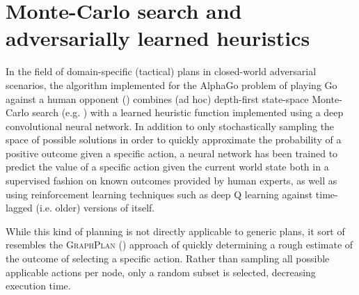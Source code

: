 \documentclass[12pt, a4paper, oneside]{article}
\begin{document}
\section{Monte-Carlo search and adversarially learned heuristics}

In the field of domain-specific (tactical) plans in closed-world adversarial scenarios,
the algorithm implemented for the AlphaGo problem of playing Go against a human opponent (\cite{SilverHuangEtAl16nature})
combines (ad hoc) depth-first state-space Monte-Carlo search (e.g. \cite{journals/tciaig/BrownePWLCRTPSC12}) with a learned 
heuristic function implemented using a deep convolutional neural network.
In addition to only stochastically sampling the space of possible solutions in order
to quickly approximate the probability of a positive outcome given a specific action,
a neural network has been trained to predict the value of a specific action given the current world state both in a supervised fashion on known
outcomes provided by human experts, 
as well as using reinforcement learning techniques such as deep Q learning
against time-lagged (i.e. older) versions of itself.

While this kind of planning is not directly applicable to generic plans,
it sort of resembles the \textsc{GraphPlan} (\cite{Blum95fastplanning}) approach
of quickly determining a rough estimate of the outcome of selecting a specific
action.
Rather than sampling all possible applicable actions per node, only a random subset
is selected, decreasing execution time.

\printbibliography 
\end{document}
